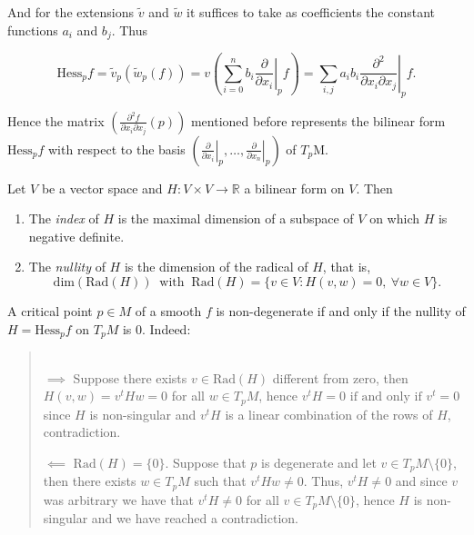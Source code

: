 And for the extensions $\tilde{v}$ and $\tilde{w}$ it suffices to take as coefficients the constant functions $a_i$ and $b_j$. Thus

\begin{equation*}
    \text{Hess}_pf= \tilde{v}_{p}(\tilde{w}_{p}(f)) = v\left(\sum_{i=0}^n b_i \left.\frac{\partial}{\partial x_i}\right|_p f\right)=\sum_{i,j} a_ib_i\left.\frac{\partial^{2}}{\partial x_i \partial x_j}\right|_p f . %
\end{equation*}
\medskip

Hence the matrix $\left(\frac{\partial^{2}f}{\partial x_i \partial x_j}(p)\right)$ mentioned before represents the bilinear form $\text{Hess}_pf$ with respect to the basis $\left( \left.\frac{\partial}{\partial x_i}\right|_p,\dots, \left.\frac{\partial}{\partial x_n}\right|_p \right)$ of $T_p\mathrm{M}$.

\vspace{3em}

\begin{definition}
    Let $V$ be a vector space and $H:V\times V\to \mathbb{R}$ a bilinear form on $V$. Then

    \begin{enumerate}[label=\roman*)]
        \item The \textit{index} of $H$ is the maximal dimension of a subspace of $V$ on which $H$ is negative definite.

        \item The \textit{nullity} of $H$ is the dimension of the radical of $H$, that is,
        \begin{equation*}
            \text{dim}(\text{Rad}(H)) ~\text{ with }~ \text{Rad}(H)=\{v\in V:H(v,w)=0, ~\forall w\in V \}.
        \end{equation*}

    \end{enumerate}
\end{definition}


\begin{remark}
    A critical point $p\in M$ of a smooth $f$ is non-degenerate if and only if the nullity of $H=\text{Hess}_pf$ on $T_pM$ is $0$. Indeed:
    \vspace{-2em}
    \begin{quote}
        \mbox{}\\[0.5em]
        $\boxed{\implies}$ Suppose there exists $v\in \text{Rad}(H)$ different from zero, then $H(v,w)=v^tHw=0$ for all $w\in T_pM$, hence $v^tH=0 \text{ if and only if } v^t = 0$ since $H$ is non-singular and $v^tH$ is a linear combination of the rows of $H$, contradiction.

        $\boxed{\impliedby}$ $\text{Rad}(H)=\{0\}$. Suppose that $p$ is degenerate and let $v\in T_pM\setminus\{0\}$, then there exists $w\in T_pM$ such that $v^tHw\neq 0$. Thus, $v^tH\neq 0$ and since $v$ was arbitrary we have that $v^tH\neq 0$ for all $v\in T_pM\setminus\{0\}$, hence $H$ is non-singular and we have reached a contradiction.
    \end{quote}
\end{remark}
\bigskip

